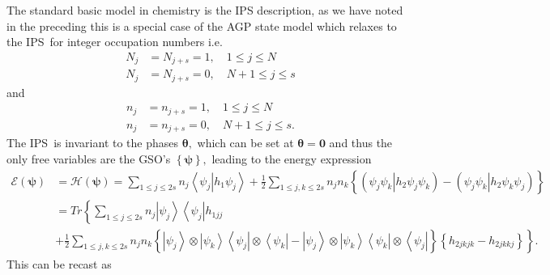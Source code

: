 \documentclass[aps,preprint]{revtex4}%
\begin{document}
The standard basic model in chemistry is the IPS description, as we have noted
in the preceding this is a special case of the AGP state model which relaxes
to the IPS\ for integer occupation numbers i.e.
\begin{align}
N_{j}  &  =N_{j+s}=1,\quad1\leq j\leq N\nonumber\\
N_{j}  &  =N_{j+s}=0,\quad N+1\leq j\leq s
\end{align}
and%
\begin{align}
n_{j}  &  =n_{j+s}=1,\quad1\leq j\leq N\nonumber\\
n_{j}  &  =n_{j+s}=0,\quad N+1\leq j\leq s.
\end{align}
The IPS\ is invariant to the phases $\mathbf{\theta,}$ which can be set at
$\mathbf{\theta=0}$ and thus the only free variables are the GSO's $\left\{
\mathbf{\psi}\right\}  ,$ leading to the energy expression
\begin{align}
\mathcal{E}\left(  \mathbf{\psi}\right)   &  =\mathcal{H}\left(  \mathbf{\psi
}\right)  =\sum_{1\leq j\leq2s}n_{j}\left\langle \psi_{j}\right\vert
h_{1}\left.  \psi_{j}\right\rangle +\frac{1}{2}\sum_{1\leq j,k\leq2s}%
n_{j}n_{k}\left\{  \left(  \left.  \psi_{j}\psi_{k}\right\vert h_{2}\psi
_{j}\psi_{k}\right)  -\left(  \left.  \psi_{j}\psi_{k}\right\vert h_{2}%
\psi_{k}\psi_{j}\right)  \right\} \nonumber\\
&  =Tr\left\{  \sum_{1\leq j\leq2s}n_{j}\left\vert \psi_{j}\right\rangle
\left\langle \psi_{j}\right\vert h_{1jj}\right. \nonumber\\
&  +\left.  \frac{1}{2}\sum_{1\leq j,k\leq2s}n_{j}n_{k}\left\{  \left\vert
\psi_{j}\right\rangle \otimes\left\vert \psi_{k}\right\rangle \left\langle
\psi_{j}\right\vert \otimes\left\langle \psi_{k}\right\vert -\left\vert
\psi_{j}\right\rangle \otimes\left\vert \psi_{k}\right\rangle \left\langle
\psi_{k}\right\vert \otimes\left\langle \psi_{j}\right\vert \right\}  \left\{
h_{2jkjk}-h_{2jkkj}\right\}  \right\}  .
\end{align}
This can be recast as
\end{document}
